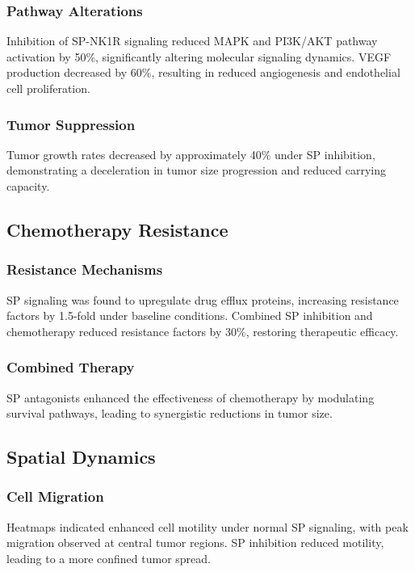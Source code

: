 \documentclass{article}
\theoremstyle{plain}
\theoremstyle{definition}
\begin{document}
\subsubsection{Pathway Alterations}
Inhibition of SP-NK1R signaling reduced MAPK and PI3K/AKT pathway activation by 50\%, significantly altering molecular signaling dynamics. VEGF production decreased by 60\%, resulting in reduced angiogenesis and endothelial cell proliferation.

\subsubsection{Tumor Suppression}
Tumor growth rates decreased by approximately 40\% under SP inhibition, demonstrating a deceleration in tumor size progression and reduced carrying capacity.

\subsection{Chemotherapy Resistance}

\subsubsection{Resistance Mechanisms}
SP signaling was found to upregulate drug efflux proteins, increasing resistance factors by 1.5-fold under baseline conditions. Combined SP inhibition and chemotherapy reduced resistance factors by 30\%, restoring therapeutic efficacy.

\subsubsection{Combined Therapy}
SP antagonists enhanced the effectiveness of chemotherapy by modulating survival pathways, leading to synergistic reductions in tumor size.

\subsection{Spatial Dynamics}

\subsubsection{Cell Migration}
Heatmaps indicated enhanced cell motility under normal SP signaling, with peak migration observed at central tumor regions. SP inhibition reduced motility, leading to a more confined tumor spread.
\end{document}
